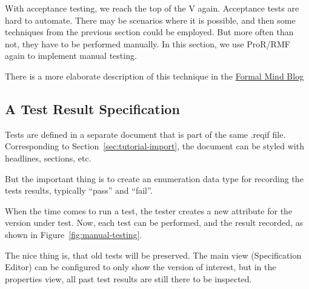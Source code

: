With acceptance testing, we reach the top of the V again.  Acceptance tests are hard to automate.  There may be scenarios where it is possible, and then some techniques from the previous section could be employed.  But more often than not, they have to be performed manually.  In this section, we use ProR/RMF again to implement manual testing.

\begin{info}
There is a more elaborate description of this technique in the \href{http://formalmind.com/de/blog/manual-testing-pror}{Formal Mind Blog}
\end{info}

\subsection{A Test Result Specification}
Tests are defined in a separate document that is part of the same .reqif file.  Corresponding to Section~\ref{sec:tutorial-import}, the document can be styled with headlines, sections, etc.

But the important thing is to create an enumeration data type for recording the tests results, typically ``pass'' and ``fail''.

When the time comes to run a test, the tester creates a new attribute for the version under test.  Now, each test can be performed, and the result recorded, as shown in Figure~\ref{fig:manual-testing}.

The nice thing is, that old tests will be preserved.  The main view (Specification Editor) can be configured to only show the version of interest, but in the properties view, all past test results are still there to be inspected.

